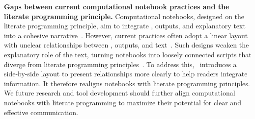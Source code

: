 \textbf{Gaps between current computational notebook practices and the literate programming principle.}
Computational notebooks, designed on the literate programming principle, aim to integrate , outputs, and explanatory text into a cohesive narrative~\cite{rule2018exploration,wang2022documentation, chattopadhyay2023make}.
However, current practices often adopt a linear layout with unclear relationships between , outputs, and text~\cite{chattopadhyay2023make}.
Such designs weaken the explanatory role of the text, turning notebooks into loosely connected scripts that diverge from literate programming principles~\cite{rule2018aiding, wagemann2022five}.
To address this, \tool~introduces a side-by-side layout to present relationships more clearly to help readers integrate information. It therefore realigns notebooks with literate programming principles.
We  future research and tool development should further align computational notebooks with literate programming to maximize their potential for clear and effective communication.


